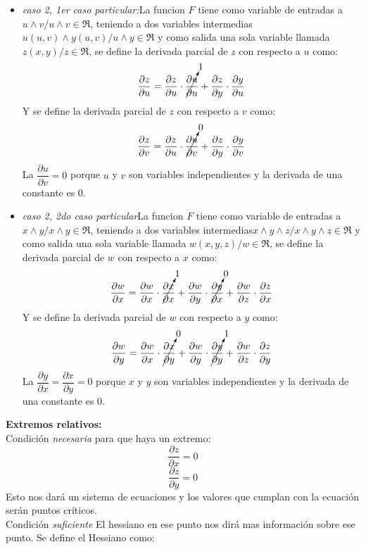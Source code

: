 \documentclass[12pt,a4paper]{article}
\begin{document}
\begin{itemize}
    \item \textit{caso 2, 1er caso particular:}La funcion $F$ tiene como variable de entradas a $u\wedge v/u \wedge v \in \Re$, teniendo a dos variables intermedias$u(u,v)\wedge y(u,v)/ u\wedge y \in \Re$ y como salida una sola variable llamada $z(x,y)/z \in \Re$, se define la derivada parcial de $z$ con respecto a $u$ como:
    $$ \dfrac{\partial z}{\partial u} =\dfrac{\partial z}{\partial u} \cdot \cancelto{1}{\dfrac{\partial u}{\partial u}}+\dfrac{\partial z}{\partial y}\cdot \dfrac{\partial y}{\partial u}$$
    Y se define la derivada parcial de $z$ con respecto a $v$ como:
   $$ \dfrac{\partial z}{\partial v} =\dfrac{\partial z}{\partial u} \cdot \cancelto{0}{\dfrac{\partial u}{\partial v}}+\dfrac{\partial z}{\partial y}\cdot \dfrac{\partial y}{\partial v}$$
   La $\dfrac{\partial u}{\partial v}=0 $ porque $u$ y $v$ son variables independientes y la derivada de una constante es 0.\\
   \item \textit{caso 2, 2do caso particular}La funcion $F$ tiene como variable de entradas a $x\wedge y/x \wedge y \in \Re$, teniendo a dos variables intermedias$x\wedge y\wedge z/ x\wedge y \wedge z \in \Re$ y como salida una sola variable llamada $w(x,y,z)/w \in \Re$, se define la derivada parcial de $w$ con respecto a $x$ como:
   $$ \dfrac{\partial w}{\partial x} =\dfrac{\partial w}{\partial x} \cdot \cancelto{1}{\dfrac{\partial x}{\partial x}}+\dfrac{\partial w}{\partial y}\cdot \cancelto{0}{\dfrac{\partial y}{\partial x}} +\dfrac{\partial w}{\partial z}\cdot \dfrac{\partial z}{\partial x}$$
   Y se define la derivada parcial de $w$ con respecto a $y$ como:
  $$ \dfrac{\partial w}{\partial y} =\dfrac{\partial w}{\partial x} \cdot \cancelto{0}{\dfrac{\partial x}{\partial y}}+\dfrac{\partial w}{\partial y}\cdot \cancelto{1}{\dfrac{\partial y}{\partial y}}+\dfrac{\partial w}{\partial z}\cdot \dfrac{\partial z}{\partial y}$$
  La $\dfrac{\partial y}{\partial x}= \dfrac{\partial x}{\partial y}=0 $ porque $x$ y $y$ son variables independientes y la derivada de una constante es 0.\\
\end{itemize}
\textbf{Extremos relativos:}\\
Condición \textit{necesaria} para que haya un extremo:
$$\dfrac{\partial z}{\partial x}=0$$
$$\dfrac{\partial z}{\partial y}= 0$$
Esto nos dará un sistema de ecuaciones y los valores que cumplan con la ecuación serán puntos críticos.\\
Condición \textit{suficiente} El hessiano en ese punto nos dirá mas información sobre ese punto. Se define el Hessiano como:\\
\end{document}
